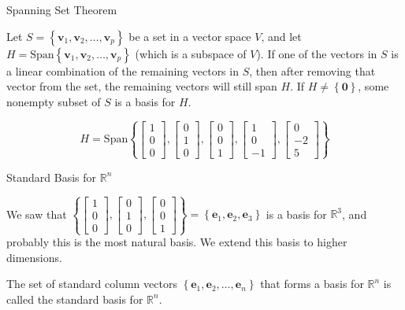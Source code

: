 \documentclass[xcolor=dvipsnames,aspectratio=169,t]{beamer}
\begin{document}
\begin{frame}{Spanning Set Theorem}

\begin{theorem}
Let $S = \left\{ \mathbf{v}_1 ,  \mathbf{v}_2 , \ldots ,  \mathbf{v}_p \right\}$ be a set in a vector space $V$, and let $H= \mbox{Span}\left\{ \mathbf{v}_1 ,  \mathbf{v}_2 , \ldots ,  \mathbf{v}_p \right\}$ (which is a subspace of $V$).
\bi
\ii If one of the vectors in $S$ is a linear combination of the remaining vectors in $S$, then after removing that vector from the set, the remaining vectors will still span $H$.
\ii If $H \ne \left\{ \mathbf{0} \right\}$, some nonempty subset of $S$ is a basis for $H$.
\ei
\end{theorem}

  \begin{example}
    \[ H = \mbox{Span} \left\{ \begin{bmatrix} 1 \\ 0 \\ 0 \end{bmatrix} ,  \begin{bmatrix} 0 \\ 1 \\ 0 \end{bmatrix} , \begin{bmatrix} 0 \\ 0 \\ 1 \end{bmatrix} , \begin{bmatrix} 1 \\ 0 \\ -1 \end{bmatrix}, \begin{bmatrix} 0 \\ -2 \\ 5 \end{bmatrix}  \right\}  \] 
  \end{example}
\end{frame}


\begin{frame}{Standard Basis for $\mathbb{R}^n$}
  \bigskip

  We saw that  $\left\{ \begin{bmatrix} 1 \\ 0 \\ 0 \end{bmatrix} ,  \begin{bmatrix} 0 \\ 1 \\ 0 \end{bmatrix} , \begin{bmatrix} 0 \\ 0 \\ 1 \end{bmatrix} \right\} = \left\{ \mathbf{e}_1 ,  \mathbf{e}_2 ,  \mathbf{e}_3 \right\}$ is a basis for $\mathbb{R}^3$, and probably this is the most natural basis.  We extend this basis to higher dimensions.
  \bigskip

  \bbox
  The set of standard column vectors $\left\{  \mathbf{e}_1 ,  \mathbf{e}_2 , \ldots ,  \mathbf{e}_n \right\}$ that forms a basis for $\mathbb{R}^n$ is called the \alert{standard basis for $\mathbb{R}^n$.}
  \ebox
\end{frame}
\end{document}
